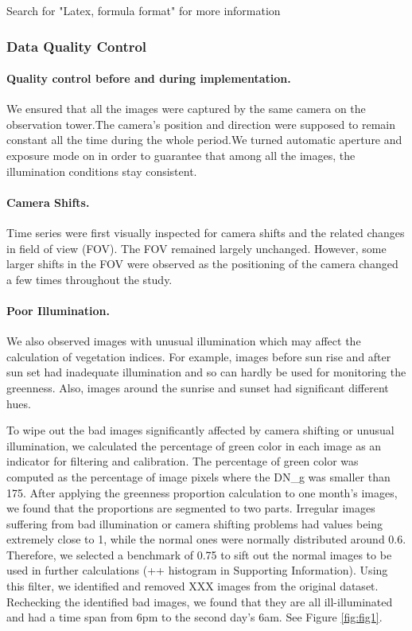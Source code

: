 \documentclass{article}
\begin{document}
Search for "Latex, formula format" for more information

\subsubsection{Data Quality Control}
\paragraph{Quality control before and during implementation.}
We ensured that all the images were captured by the same camera on the observation tower.The camera's position and direction were supposed to remain constant all the time during the whole period.We turned automatic aperture and exposure mode on in order to guarantee that among all the images, the illumination conditions stay consistent.


\paragraph{Camera Shifts.}Time series were first visually inspected for camera shifts and the related changes in field of view (FOV). The FOV remained largely unchanged. However, some larger shifts in the FOV were observed as the positioning of the camera changed a few times throughout the study. 

\paragraph{Poor Illumination.}We also observed images with unusual illumination which may affect the calculation of vegetation indices. For example, images before sun rise and after sun set had inadequate illumination and so can hardly be used for monitoring the greenness. Also, images around the sunrise and sunset had significant different hues. 

To wipe out the bad images significantly affected by camera shifting or unusual illumination, we calculated the percentage of green color in each image as an indicator for filtering and calibration. The percentage of green color was computed as the percentage of image pixels where the {DN_g}  was smaller than 175. After applying the greenness proportion calculation to one month’s images, we found that the proportions are segmented to two parts. Irregular images suffering from bad illumination or camera shifting problems had values being extremely close to 1, while the normal ones were normally distributed around 0.6. Therefore, we selected a benchmark of 0.75 to sift out the normal images to be used in further calculations (++ histogram in Supporting Information). Using this filter, we identified and removed XXX images  from the original dataset. Rechecking the identified bad images, we found that they are all ill-illuminated and had a time span from 6pm to the second day’s 6am. See Figure \ref{fig:fig1}.
\end{document}
